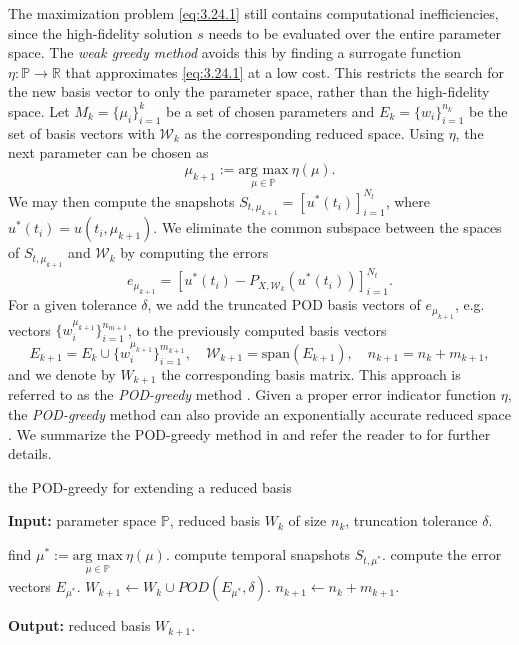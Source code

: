 The maximization problem \eqref{eq:3.24.1} still contains computational inefficiencies, since the high-fidelity solution $s$ needs to be evaluated over the entire parameter space. The \emph{weak greedy method} avoids this by finding a surrogate function $\eta:\mathbb P \to \mathbb R$ that approximates \eqref{eq:3.24.1} at a low cost. This restricts the search for the new basis vector to only the parameter space, rather than the high-fidelity space. Let $M_k=\{\mu_i\}_{i=1}^k$ be a set of chosen parameters and $E_k = \{ w_i\}_{i=1}^{n_k}$ be the set of basis vectors with $\mathcal W_k$ as the corresponding reduced space. Using $\eta$, the next parameter can be chosen as
\begin{equation}
	\mu_{k+1} := \underset{\mu \in \mathbb P}{\text{arg\ max}} \ \eta(\mu).
\end{equation}
We may then compute the snapshots $S_{t,\mu_{k+1}} = [ u^*(t_i) ]_{i=1}^{N_t}$, where $u^*(t_i) = u(t_i,\mu_{k+1})$. We eliminate the common subspace between the spaces of $S_{t,\mu_{k+1}}$ and $\mathcal W_k$ by computing the errors
\begin{equation}
	e_{\mu_{k+1}} = \left[ u^*(t_i) - P_{X,\mathcal W_k} (u^*(t_i)) \right]_{i=1}^{N_t}.
\end{equation}
For a given tolerance $\delta$, we add the truncated POD basis vectors of $e_{\mu_{k+1}}$, e.g. vectors $\{w^{\mu_{k+1}}_i\}_{i=1}^{n_{m+1}}$, to the previously computed basis vectors
\begin{equation}
	E_{k+1} = E_{k} \cup \{w^{\mu_{k+1}}_i\}_{i=1}^{m_{k+1}}, \quad \mathcal W_{k+1} = \text{span}(E_{k+1}), \quad n_{k+1} = n_k + m_{k+1},
\end{equation}
and we denote by $W_{k+1}$ the corresponding basis matrix. This approach is referred to as the \emph{POD-greedy} method \cite{haasdonk2008reduced}. Given a proper error indicator function $\eta$, the \emph{POD-greedy} method can also provide an exponentially accurate reduced space \cite{haasdonk2008reduced,haasdonk2013convergence}. We summarize the POD-greedy method in  and refer the reader to \cite{hesthaven2015certified,haasdonk2013convergence} for further details.

\begin{algorithm} 
	\caption{the POD-greedy for extending a reduced basis} \label{alg:3.3.1}
	\textbf{Input:} parameter space $\mathbb P$, reduced basis $W_k$ of size $n_k$, truncation tolerance $\delta$.
	\begin{algorithmic} [1]
		\State find $\mu^* := \underset{\mu \in \mathbb P}{\text{arg\ max}} \ \eta(\mu)$.
		\State compute temporal snapshots $S_{t,\mu^*}$.
		\State compute the error vectors $E_{\mu^*}$.
		\State $W_{k+1} \leftarrow W_{k} \cup POD(E_{\mu^*},\delta)$.
		\State $n_{k+1} \leftarrow n_k + m_{k+1}$.
	\end{algorithmic}
	\vspace{0.5cm}
	\textbf{Output:} reduced basis $W_{k+1}$.
\end{algorithm}




